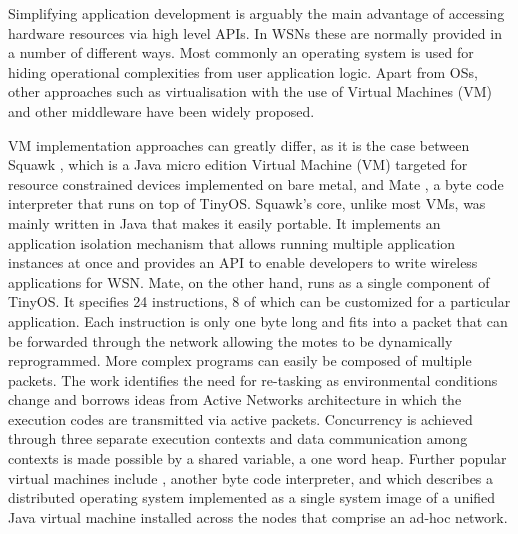 Simplifying application development is arguably the main advantage of accessing hardware resources via high level APIs. In WSNs these are normally provided in a number of different ways. Most commonly an operating system is used for hiding operational complexities from user application logic. Apart from OSs, other approaches such as virtualisation with the use of Virtual Machines (VM) \cite{Levis:2002:MTV:635506.605407,4300022,simon2005squawk,hong2009tinyvm} and other middleware \cite{Fok:2009:AMA:1552297.1552299,1621014,6529470,6671886} have been widely proposed.



VM implementation approaches can greatly differ, as it is the case between Squawk \cite{simon2005squawk}, which is a Java micro edition Virtual Machine (VM) targeted for resource constrained devices implemented on bare metal, and Mate \cite{Levis:2002:MTV:635506.605407}, a byte code interpreter that runs on top of TinyOS. Squawk's core, unlike most VMs, was mainly written in Java that makes it easily portable. It implements an application isolation mechanism that allows running multiple application instances at once and provides an API to enable developers to write wireless applications for WSN. 
Mate, on the other hand, runs as a single component of TinyOS.  It specifies 24 instructions, 8 of which can be customized for a particular application. Each instruction is only one byte long and fits into a packet that can be forwarded through the network allowing the motes to be dynamically reprogrammed. More complex programs can easily be composed of multiple packets. The work identifies the need for re-tasking as environmental conditions change and borrows ideas from Active Networks architecture in which the execution codes are transmitted via active packets. Concurrency is achieved through three separate execution contexts and data communication among contexts is made possible by a shared variable, a one word heap. Further popular virtual machines include \cite{hong2009tinyvm}, another byte code interpreter, and \cite{Barr:2002:NSS:509526.509528} which describes a distributed operating system implemented as a single system image of a unified Java virtual machine installed across the nodes that comprise an ad-hoc network.


